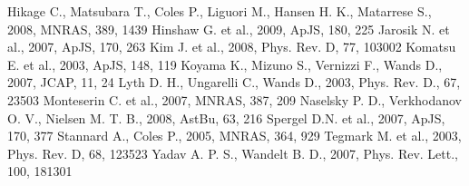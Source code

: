 \documentclass[useAMS,usenatbib,usegraphicx]{mn2e}
\begin{document}
\begin{thebibliography}{99}
Hikage C., Matsubara T., Coles P., Liguori M., Hansen H. K.,
Matarrese S., 2008, MNRAS, 389, 1439
 Hinshaw G.  et al., 2009, ApJS, 180, 225
 Jarosik N.  et al., 2007, ApJS, 170, 263
 Kim J. et
al., 2008, Phys. Rev. D, 77, 103002
  Komatsu E. et al., 2003, ApJS, 148, 119
  Koyama K., Mizuno S., Vernizzi F., Wands D., 2007, JCAP, 11, 24
  Lyth D. H., Ungarelli C., Wands D., 2003,
  Phys. Rev. D., 67, 23503
 Monteserin C.  et al., 2007, MNRAS, 387, 209
 Naselsky P. D., Verkhodanov O. V., Nielsen M.
T. B., 2008, AstBu,  63, 216
  Spergel  D.N. et al., 2007, ApJS, 170, 377
Stannard A., Coles P., 2005, MNRAS, 364, 929
 Tegmark M. et al., 2003, Phys. Rev. D, 68, 123523
  Yadav A. P. S., Wandelt B. D., 2007, Phys. Rev. Lett., 100, 181301
\end{thebibliography}
\end{document}
